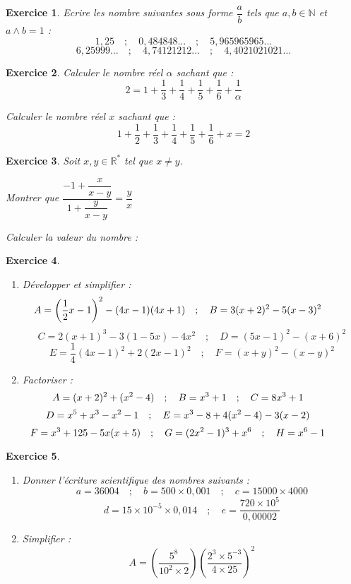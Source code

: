 \documentclass[12pt,a4paper]{article}
\theoremstyle{mystyle}
\newtheorem{exo}{Exercice}
\begin{document}
\begin{multicols*}{2}
\begin{exo}
Ecrire les nombre suivantes sous forme $\dfrac{a}{b}$ tels que $a,b\in\mathbb{N}$ et $a\wedge b = 1$ :
$$1,25\quad;\quad 0,484848\dots\quad;\quad 5,965965965\dots$$
$$6,25999\dots\quad;\quad4,74121212\dots\quad;\quad4,4021021021\dots$$
\end{exo}

\begin{exo}
Calculer le nombre réel $\alpha$ sachant que : 
$$2 = 1 + \dfrac{1}{3} + \dfrac{1}{4} + \dfrac{1}{5} + \dfrac{1}{6} + \dfrac{1}{\alpha}$$

Calculer le nombre réel $x$ sachant que : 
$$1 + \dfrac{1}{2} + \dfrac{1}{3} + \dfrac{1}{4} + \dfrac{1}{5} + \dfrac{1}{6} + x = 2$$
\end{exo}
	
\begin{exo}
Soit $x,y\in\mathbb{R}^*$ tel que $x\neq y$.
	
	Montrer que $\dfrac{-1 + \dfrac{x}{x - y}}{1 + \dfrac{y}{x - y}} = \dfrac{y}{x}$
	
	Calculer la valeur du nombre : 
\end{exo}


\begin{exo}
\text{ }
	\begin{enumerate}
		\item Développer et simplifier :
		$$\hspace{-10mm}A = \left(\dfrac{1}{2}x - 1\right)^2 - (4x - 1)(4x + 1)  \quad ; \quad B = 3(x+2)^2 - 5(x - 3)^2$$
		$$C = 2(x+1)^3 -3(1-5x) - 4x^2  \quad ; \quad  D = (5x-1)^2 - (x+6)^2$$
		$$E = \dfrac{1}{4}(4x - 1)^2 + 2(2x - 1)^2 \quad;\quad F = (x + y)^2 - (x - y)^2$$
		\item Factoriser :
		\[
\hspace{-10mm} A = (x + 2)^2 + (x^2 - 4) \quad ; \quad B = x^3 + 1\quad;\quad C = 8x^3 + 1 \]
\[
\hspace{-10mm}  D = x^5 + x^3 - x^2 - 1\quad ; \quad E = x^3 - 8 + 4(x^2 - 4) - 3(x - 2)
\]
\[
\hspace{-10mm} F = x^3 + 125 - 5x(x + 5) \quad ; \quad G = (2x^2 - 1)^3 + x^6  \quad ; \quad H = x^6 - 1
\]
	\end{enumerate}
\end{exo}
	
\begin{exo}
	\text{ }
	\begin{enumerate}
		\item Donner l'écriture scientifique des nombres suivants :
		$$a = 36004 \quad;\quad b = 500\times 0,001 \quad;\quad c = 15000 \times 4000$$
		$$d = 15\times 10^{-5}\times 0,014 \quad;\quad e = \dfrac{720\times 10^5}{0,00002}$$
		\item Simplifier :
		$$A = \left(\dfrac{5^8}{10^2\times 2}\right)\left(\dfrac{2^3\times 5^{-3}}{4\times 25}\right)^2 $$
		\end{enumerate}
\end{exo}


\end{multicols*}
\end{document}

